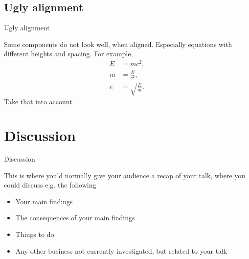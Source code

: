 \documentclass[aspectratio = 169]{beamer}
\begin{document}
\subsection{Ugly alignment}
\begin{frame}{Ugly alignment}

Some components do not look well, when aligned. Especially equations with different heights and spacing. For example,
\begin{align}
E &= mc^2,\\
m &= \frac{E}{c^2},\\
c &= \sqrt{\frac{E}{m}}.
\end{align}
Take that into account.

\end{frame}

\section{Discussion}
\begin{frame}{Discussion}

This is where you’d normally give your audience a recap of your talk, where you could
discuss e.g. the following
\begin{itemize}
\item Your main findings
\item The consequences of your main findings
\item Things to do
\item Any other business not currently investigated, but related to your talk
\end{itemize}

\end{frame}
\end{document}
